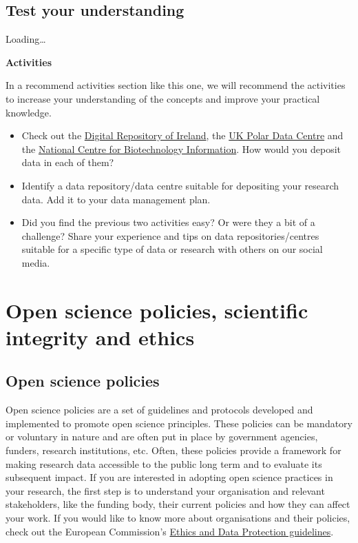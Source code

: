\documentclass[
]{book}
\begin{document}
\hypertarget{test-your-understanding-5}{%
\section{Test your understanding}\label{test-your-understanding-5}}

Loading\ldots{}

\textbf{Activities}

In a recommend activities section like this one, we will recommend the activities to increase your understanding of the concepts and improve your practical knowledge.

\begin{itemize}
\item
  Check out the \href{https://dri.ie/}{Digital Repository of Ireland}, the \href{https://www.bas.ac.uk/data/uk-pdc/}{UK Polar Data Centre} and the \href{https://www.ncbi.nlm.nih.gov/}{National Centre for Biotechnology Information}. How would you deposit data in each of them?
\item
  Identify a data repository/data centre suitable for depositing your research data. Add it to your data management plan.
\item
  Did you find the previous two activities easy? Or were they a bit of a challenge? Share your experience and tips on data repositories/centres suitable for a specific type of data or research with others on our social media.
\end{itemize}

\hypertarget{open-science-policies-scientific-integrity-and-ethics}{%
\chapter{Open science policies, scientific integrity and ethics}\label{open-science-policies-scientific-integrity-and-ethics}}

\hypertarget{open-science-policies}{%
\section{Open science policies}\label{open-science-policies}}

Open science policies are a set of guidelines and protocols developed and implemented to promote open science principles. These policies can be mandatory or voluntary in nature and are often put in place by government agencies, funders, research institutions, etc. Often, these policies provide a framework for making research data accessible to the public long term and to evaluate its subsequent impact. If you are interested in adopting open science practices in your research, the first step is to understand your organisation and relevant stakeholders, like the funding body, their current policies and how they can affect your work. If you would like to know more about organisations and their policies, check out the European Commission's \href{https://ec.europa.eu/research/participants/data/ref/h2020/grants_manual/hi/ethics/h2020_hi_ethics-data-protection_en.pdf}{Ethics and Data Protection guidelines}.
\end{document}
